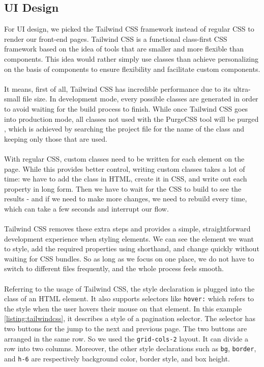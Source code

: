 \documentclass{article}
\begin{document}
\subsection{UI Design}
For UI design, we picked the Tailwind CSS framework instead of regular CSS to render our front-end pages. Tailwind CSS is a functional class-first CSS framework based on the idea of tools that are smaller and more flexible than components. This idea would rather simply use classes than achieve personalizing on the basis of components to ensure flexibility and facilitate custom components.
\\\\
It means, first of all, Tailwind CSS has incredible performance due to its ultra-small file size. In development mode, every possible classes are generated in order to avoid waiting for the build process to finish. While once Tailwind CSS goes into production mode,  all classes not used with the PurgeCSS tool will be purged , which is achieved by searching the project file for the name of the class and keeping only those that are used. 
\\\\
With regular CSS, custom classes need to be written for each element on the page. While this provides better control, writing custom classes takes a lot of time: we have to add the class in HTML, create it in CSS, and write out each property in long form. Then we have to wait for the CSS to build to see the results - and if we need to make more changes, we need to rebuild every time, which can take a few seconds and interrupt our flow.
\\\\
Tailwind CSS removes these extra steps and provides a simple, straightforward development experience when styling elements. We can see the element we want to style, add the required properties using shorthand, and change quickly without waiting for CSS bundles. So as long as we focus on one place, we do not have to switch to different files frequently, and the whole process feels smooth.
\\\\
Referring to the usage of Tailwind CSS, the style declaration is plugged into the class of an HTML element. It also supports selectors like \verb|hover:| which refers to the style when the user hovers their mouse on that element. In this example \ref{listing:tailwindcss}, it describes a style of a pagination selector. The selector has two buttons for the jump to the next and previous page. The two buttons are arranged in the same row. So we used the \verb|grid-cols-2| layout. It can divide a row into two columns. Moreover, the other style declarations such as \verb|bg|, \verb|border|, and \verb|h-6| are respectively background color, border style, and box height.
\end{document}
